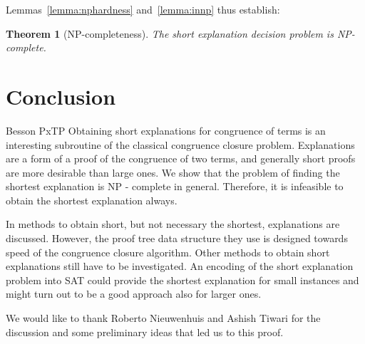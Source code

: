 \documentclass{easychair}
\newtheorem{theorem}{Theorem}
\begin{document}
Lemmas~\ref{lemma:nphardness} and~\ref{lemma:innp} thus establish:

\begin{theorem}[NP-completeness]
The short explanation decision problem is NP-complete.
\end{theorem}

\section*{Conclusion}

Besson PxTP
Obtaining short explanations for congruence of terms is an interesting subroutine of the classical congruence closure problem.
Explanations are a form of a proof of the congruence of two terms, and generally short proofs are more desirable than large ones.
We show that the problem of finding the shortest explanation is NP - complete in general.
Therefore, it is infeasible to obtain the shortest explanation always.

In \cite{Nieuwenhuis3,Nieuwenhuis9} methods to obtain short, but not necessary the shortest, explanations are discussed.
However, the proof tree data structure they use is designed towards speed of the congruence closure algorithm.
Other methods to obtain short explanations still have to be investigated.
An encoding of the short explanation problem into SAT could provide the shortest explanation for small instances and might turn out to be a good approach also for larger ones.

We would like to thank Roberto Nieuwenhuis and Ashish Tiwari for the discussion
and some preliminary ideas that led us to this proof.



\end{document}
